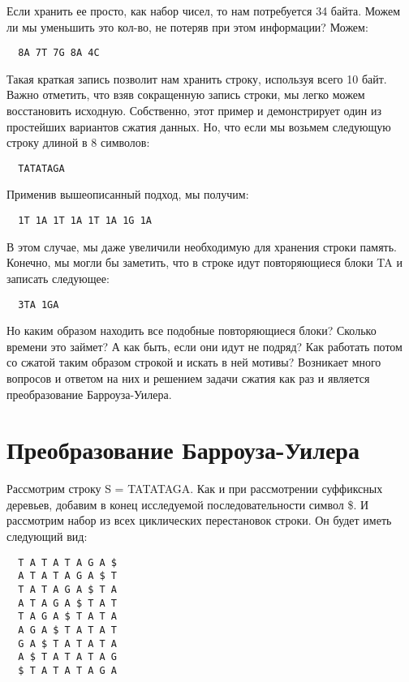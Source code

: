 \documentclass[letterpaper, 11pt]{article}
\begin{document}
Если хранить ее просто, как набор чисел, то нам потребуется 34 байта. Можем ли мы уменьшить это кол-во, не потеряв при этом информации? Можем:

\begin{verbatim}
  8A 7T 7G 8A 4C
\end{verbatim}

Такая краткая запись позволит нам хранить строку, используя всего 10 байт. Важно отметить, что взяв сокращенную запись строки, мы легко можем восстановить исходную. Собственно, этот пример и демонстрирует один из простейших вариантов сжатия данных. Но, что если мы возьмем следующую строку длиной в 8 символов:

\begin{verbatim}
  TATATAGA
\end{verbatim}

Применив вышеописанный подход, мы получим:

\begin{verbatim}
  1T 1A 1T 1A 1T 1A 1G 1A
\end{verbatim}

В этом случае, мы даже увеличили необходимую для хранения строки память. Конечно, мы могли бы заметить, что в строке идут повторяющиеся блоки TA и записать следующее:

\begin{verbatim}
  3TA 1GA
\end{verbatim}

Но каким образом находить все подобные повторяющиеся блоки? Сколько времени это займет? А как быть, если они идут не подряд? Как работать потом со сжатой таким образом строкой и искать в ней мотивы? Возникает много вопросов и ответом на них и решением задачи сжатия как раз и является преобразование Барроуза-Уилера.

\section{Преобразование Барроуза-Уилера}

Рассмотрим строку S = TATATAGA. Как и при рассмотрении суффиксных деревьев, добавим в конец исследуемой последовательности символ \$. И рассмотрим набор из всех циклических перестановок строки. Он будет иметь следующий вид:
\begin{verbatim}
  T A T A T A G A $
  A T A T A G A $ T
  T A T A G A $ T A
  A T A G A $ T A T
  T A G A $ T A T A
  A G A $ T A T A T
  G A $ T A T A T A
  A $ T A T A T A G
  $ T A T A T A G A
\end{verbatim}
\end{document}
